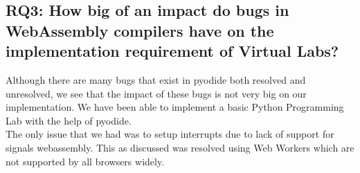 \subsection{RQ3: How big of an impact do bugs in WebAssembly compilers have on the implementation requirement of Virtual Labs?}
Although there are many bugs that exist in pyodide both resolved and unresolved, we see that the impact of these bugs is not very big on our implementation. We have been able to implement a basic Python Programming Lab with the help of pyodide. \\
The only issue that we had was to setup interrupts due to lack of support for signals webassembly. This as discussed was resolved using Web Workers which are not supported by all browsers widely. \\
